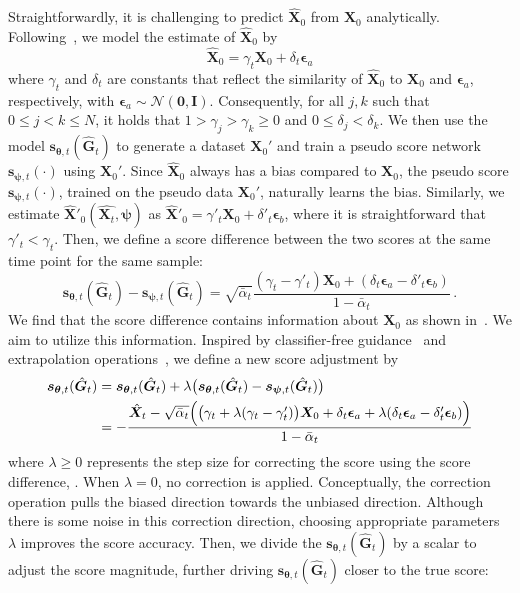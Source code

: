 \documentclass{article}
\newcommand{\s}{{{\bm s}}}
\newcommand{\X}{{{\bm X}}}
\newcommand{\G}{{{\bm G}}}
\newcommand{\EPS}{{\bm\epsilon}}
\newcommand{\THETA}{{\bm\theta}}
\newcommand{\PSI}{{\bm\psi}}
\begin{document}
Straightforwardly, it is challenging to predict $\hat{\X}_0$ from $\X_0$ analytically. Following~\cite{zhang2023lookahead}, we model the estimate of $\hat{\X}_0$ by
\begin{equation}
\hat{\X}_{0} = \gamma_t\X_0 + \delta_t\EPS_a
\label{eq:x_model}
\end{equation}
where $\gamma_t$ and $\delta_t$ are constants that reflect the similarity of $\hat{\X}_{0}$ to $\X_0$ and $\EPS_a$, respectively, with $\EPS_a \sim \mathcal{N}(\bm{0},\boldsymbol{I})$. Consequently, for all $j,k$ such that $0\leq j<k\leq N$, it holds that $1>\gamma_j>\gamma_k\geq0$ and $0\leq \delta_j < \delta_k$. We then use the model $\s_{\THETA,t}(\hat{\G}_t)$ to generate a dataset ${\X}_0'$ and train a pseudo score network $\s_{\PSI,t}(\cdot)$ using ${\X}_0'$. Since $\hat{\X}_0$ always has a bias compared to $\X_0$, the pseudo score $\s_{\PSI,t}(\cdot)$, trained on the pseudo data $\X_0'$, naturally learns the bias. Similarly, we estimate $\hat{\X}'_0(\hat{\X_t},\PSI)$ as $\hat{\X}'_0 = \gamma'_t\X_0 + \delta'_t\EPS_b$, where it is straightforward that $\gamma'_t < \gamma_t$. Then, we define a score difference between the two scores at the same time point for the same sample:
\begin{equation}
\s_{\THETA,t}(\hat{\G}_t) - \s_{\PSI,t}(\hat{\G}_t) 
= \sqrt{\bar{\alpha}_t}\frac{(\gamma_t - \gamma'_t)\X_0 + (\delta_t\EPS_a - \delta'_t\EPS_b)}{{1-\bar{\alpha}_t}}\,.
\label{eq:score_diff}
\end{equation}
We find that the score difference contains information about $\X_0$ as shown in~. We aim to utilize this information. Inspired by classifier-free guidance~\citep{ho2021classifier} and extrapolation operations~\citep{zhang2023lookahead}, we define a new score adjustment by
\begin{align}
\s_{\THETA,t}(\hat{\G}_t)&=\s_{\THETA,t}(\hat{\G}_t) + \lambda \bigl( \s_{\THETA,t}(\hat{\G}_t) - \s_{\PSI,t}(\hat{\G}_t) \bigr) \notag\\
&= -\frac{\hat{\X}_t - \sqrt{\bar{\alpha}_t} \Bigl(\bigl(\gamma_t + \lambda (\gamma_t - \gamma'_t)\bigr) \X_0 + \delta_t \EPS_a + \lambda (\delta_t \EPS_a - \delta'_t \EPS_b) \Bigr)}{1 - \bar{\alpha}_t}
\label{eq:direction_corrected_score}
\end{align}
where $\lambda \geq 0$ represents the step size for correcting the score using the score difference, . When $\lambda = 0$, no correction is applied. Conceptually, the correction operation pulls the biased direction towards the unbiased direction. Although there is some noise in this correction direction, choosing appropriate parameters $\lambda$ improves the score accuracy. Then, we divide the $\s_{\THETA,t}(\hat{\G}_t)$ by a scalar to adjust the score magnitude, further driving $\s_{\THETA,t}(\hat{\G}_t)$ closer to the true score:
\end{document}
